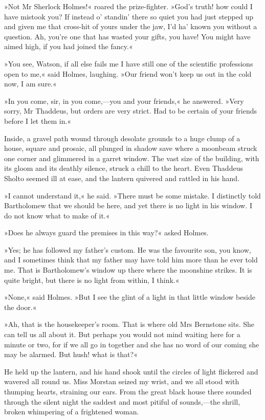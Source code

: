 »Not Mr Sherlock Holmes!« roared the prize-fighter. »God's truth! how could I have mistook you? If instead o' standin' there so quiet you had just stepped up and given me that cross-hit of yours under the jaw, I'd ha' known you without a question. Ah, you're one that has wasted your gifts, you have! You might have aimed high, if you had joined the fancy.«

»You see, Watson, if all else fails me I have still one of the scientific professions open to me,« said Holmes, laughing. »Our friend won't keep us out in the cold now, I am sure.«

»In you come, sir, in you come,—you and your friends,« he answered. »Very sorry, Mr Thaddeus, but orders are very strict. Had to be certain of your friends before I let them in.«

Inside, a gravel path wound through desolate grounds to a huge clump of a house, square and prosaic, all plunged in shadow save where a moonbeam struck one corner and glimmered in a garret window. The vast size of the building, with its gloom and its deathly silence, struck a chill to the heart. Even Thaddeus Sholto seemed ill at ease, and the lantern quivered and rattled in his hand.

»I cannot understand it,« he said. »There must be some mistake. I distinctly told Bartholomew that we should be here, and yet there is no light in his window. I do not know what to make of it.«

»Does he always guard the premises in this way?« asked Holmes.

»Yes; he has followed my father's custom. He was the favourite son, you know, and I sometimes think that my father may have told him more than he ever told me. That is Bartholomew's window up there where the moonshine strikes. It is quite bright, but there is no light from within, I think.«

»None,« said Holmes. »But I see the glint of a light in that little window beside the door.«

»Ah, that is the housekeeper's room. That is where old Mrs Bernstone sits. She can tell us all about it. But perhaps you would not mind waiting here for a minute or two, for if we all go in together and she has no word of our coming she may be alarmed. But hush! what is that?«

He held up the lantern, and his hand shook until the circles of light flickered and wavered all round us. Miss Morstan seized my wrist, and we all stood with thumping hearts, straining our ears. From the great black house there sounded through the silent night the saddest and most pitiful of sounds,—the shrill, broken whimpering of a frightened woman.

